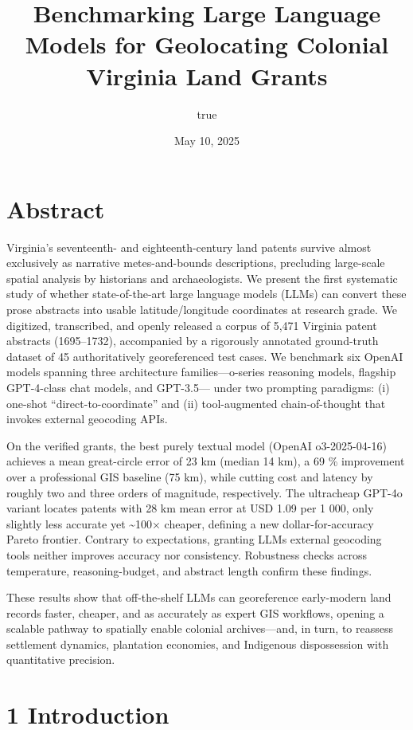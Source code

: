 \documentclass[
  11pt,
]{article}
\title{Benchmarking Large Language Models for Geolocating Colonial
Virginia Land Grants}
\author{true}
\date{May 10, 2025}
\begin{document}
\maketitle

\section{Abstract}\label{abstract}

Virginia's seventeenth- and eighteenth-century land patents survive
almost exclusively as narrative metes-and-bounds descriptions,
precluding large-scale spatial analysis by historians and
archaeologists. We present the first systematic study of whether
state-of-the-art large language models (LLMs) can convert these prose
abstracts into usable latitude/longitude coordinates at research grade.
We digitized, transcribed, and openly released a corpus of 5,471
Virginia patent abstracts (1695--1732), accompanied by a rigorously
annotated ground-truth dataset of 45 authoritatively georeferenced test
cases. We benchmark six OpenAI models spanning three architecture
families---o-series reasoning models, flagship GPT-4-class chat models,
and GPT-3.5--- under two prompting paradigms: (i) one-shot
``direct-to-coordinate'' and (ii) tool-augmented chain-of-thought that
invokes external geocoding APIs.

On the verified grants, the best purely textual model (OpenAI
o3-2025-04-16) achieves a mean great-circle error of 23 km (median 14
km), a 69 \% improvement over a professional GIS baseline (75 km), while
cutting cost and latency by roughly two and three orders of magnitude,
respectively. The ultracheap GPT-4o variant locates patents with 28 km
mean error at USD 1.09 per 1 000, only slightly less accurate yet
\textasciitilde100× cheaper, defining a new dollar-for-accuracy Pareto
frontier. Contrary to expectations, granting LLMs external geocoding
tools neither improves accuracy nor consistency. Robustness checks
across temperature, reasoning-budget, and abstract length confirm these
findings.

These results show that off-the-shelf LLMs can georeference early-modern
land records faster, cheaper, and as accurately as expert GIS workflows,
opening a scalable pathway to spatially enable colonial archives---and,
in turn, to reassess settlement dynamics, plantation economies, and
Indigenous dispossession with quantitative precision.

\section{1 Introduction}\label{introduction}
\end{document}
